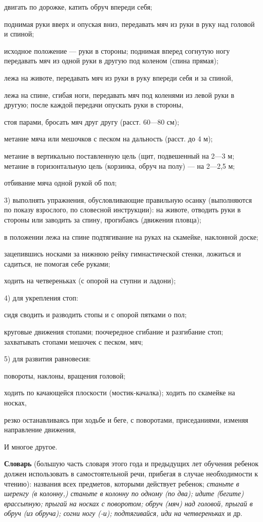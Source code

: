 \documentclass[a5paper]{book}
\renewcommand{\emph}[1]{\textit{#1}}
\begin{document}
двигать по дорожке, катить обруч впереди себя;

поднимая руки вверх и опуская вниз, передавать мяч из руки в руку над
головой и спиной;

исходное положение --- руки в стороны; поднимая вперед согнутую ногу
передавать мяч из одной руки в другую под коленом (спина прямая);

лежа на животе, передавать мяч из руки в руку впереди себя и за спиной,

лежа на спине, сгибая ноги, передавать мяч под коленями из левой руки в
другую; после каждой передачи опускать руки в стороны,

стоя парами, бросать мяч друг другу (расст. 60---80 см);

метание мяча или мешочков с песком на дальность (расст. до 4 м);

метание в вертикально поставленную цель (щит, подвешенный на 2---3 м;
метание в горизонтальную цель (корзинка, обруч на полу) --- на 2---2,5
м;

отбивание мяча одной рукой об пол;

3) выполнять упражнения, обусловливающие правильную осанку (выполняются
по показу взрослого, по словесной инструкции): на животе, отводить руки
в стороны или заводить за спину, прогибаясь (движения пловца);

в положении лежа на спине подтягивание на руках на скамейке, наклонной
доске;

зацепившись носками за нижнюю рейку гимнастической стенки, ложиться и
садиться, не помогая себе руками;

ходить на четвереньках (с опорой на ступни и ладони);

4) для укрепления стоп:

сидя сводить и разводить стопы и с опорой пятками о пол;

круговые движения стопами; поочередное сгибание и разгибание стоп;
захватывать стопами мешочек с песком, мяч;

5) для развития равновесия:

повороты, наклоны, вращения головой;

ходить по качающейся плоскости (мостик-качалка); ходить по скамейке на
носках,

резко останавливаясь при ходьбе и беге, с поворотами, приседаниями,
изменяя направление движения,

И многое другое.

\textbf{Словарь} (большую часть словаря этого года и предыдущих лет
обучения ребенок должен использовать в самостоятельной речи, прибегая в
случае необходимости к чтению): названия всех предметов, которыми
действует ребенок; \emph{станьте в шеренгу (в колонну,) станьте в
колонну по одному (по два); идите (бегите) врассыпную; прыгай на носках
с поворотом; обруч (мяч) над головой, прыгай в обруч (из обруча); согни
ногу (-и); подтягивайся, иди на четвереньках} и др.
\end{document}
